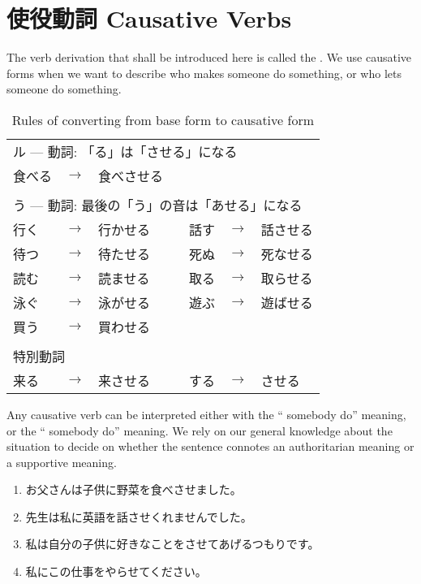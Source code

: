 \documentclass[notoc,notitlepage]{tufte-book}
\begin{document}

\section{使役動詞 Causative Verbs}%
\label{sec:shiekidoushi_causative_verbs}

The verb derivation that shall be introduced here is called the
. We use causative forms when we want to describe
who makes someone do something, or who lets someone do something.

\begin{table}[ht]
  \centering
  \caption{Rules of converting from base form to causative form}
  \label{table:rules_of_converting_from_base_form_to_causative_form}
  \begin{tabular}{l c l c l c l}
  \multicolumn{7}{l}{ル --- 動詞: 「る」は「させる」になる} \\
  食べる & $\to$ & 食べさせる &  &  &  &  \\
  $  $ \\
  \multicolumn{7}{l}{う --- 動詞: 最後の「う」の音は「あせる」になる} \\
  行く & $\to$ & 行かせる & & 話す & $\to$ & 話させる \\
  待つ & $\to$ & 待たせる & & 死ぬ & $\to$ & 死なせる \\
  読む & $\to$ & 読ませる & & 取る & $\to$ & 取らせる \\
  泳ぐ & $\to$ & 泳がせる & & 遊ぶ & $\to$ & 遊ばせる \\
  買う & $\to$ & 買わせる \\
  $  $ \\
  \multicolumn{7}{l}{特別動詞} \\
  来る & $\to$ & 来させる & & する & $\to$ & させる
  \end{tabular}
\end{table}

\begin{note}
  Any causative verb can be interpreted either with the
  `` somebody do'' meaning, or the
  `` somebody do'' meaning.
  We rely on our general knowledge about the situation
  to decide on whether the sentence connotes an authoritarian meaning
  or a supportive meaning.
\end{note}

\begin{eg}
  \begin{enumerate}
    \item お父さんは子供に野菜を食べさせました。
    \item 先生は私に英語を話させくれませんでした。
    \item 私は自分の子供に好きなことをさせてあげるつもりです。
    \item 私にこの仕事をやらせてください。
  \end{enumerate}
\end{eg}
\end{document}
